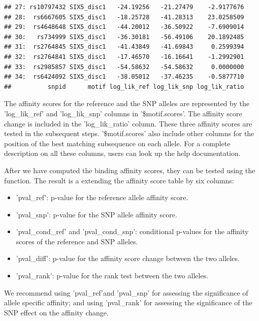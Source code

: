 \documentclass[a4paper,10pt]{article}\usepackage[]{graphicx}\usepackage[]{color}
\makeatletter
\newenvironment{kframe}{%
 \def\at@end@of@kframe{}%
 \ifinner\ifhmode%
  \def\at@end@of@kframe{\end{minipage}}%
  \begin{minipage}{\columnwidth}%
 \fi\fi%
 \def\FrameCommand##1{\hskip\@totalleftmargin \hskip-\fboxsep
 \colorbox{shadecolor}{##1}\hskip-\fboxsep
     \hskip-\linewidth \hskip-\@totalleftmargin \hskip\columnwidth}%
 \MakeFramed {\advance\hsize-\width
   \@totalleftmargin\z@ \linewidth\hsize
   \@setminipage}}%
 {\par\unskip\endMakeFramed%
 \at@end@of@kframe}
\newenvironment{knitrout}{}{} %
\makeatother
\begin{document}
\begin{knitrout}
\begin{kframe}
\begin{verbatim}
## 27: rs10797432 SIX5_disc1   -24.19256   -21.27479    -2.9177676
## 28:  rs6667605 SIX5_disc1   -18.25728   -41.28313    23.0258509
## 29:  rs4648648 SIX5_disc1   -44.20012   -36.50922    -7.6909014
## 30:   rs734999 SIX5_disc1   -36.30181   -56.49106    20.1892485
## 31:  rs2764845 SIX5_disc1   -41.43849   -41.69843     0.2599394
## 32:  rs2764841 SIX5_disc1   -17.46570   -16.16641    -1.2992901
## 33:  rs2985857 SIX5_disc1   -54.58632   -54.58632     0.0000000
## 34:  rs6424092 SIX5_disc1   -38.05012   -37.46235    -0.5877710
##          snpid      motif log_lik_ref log_lik_snp log_lik_ratio
\end{verbatim}
\end{kframe}
\end{knitrout}


The affinity scores for the reference and the SNP alleles are represented by the 'log\_lik\_ref' and 'log\_lik\_snp' columns in '\$motif.scores'. The affinity score change is included in the 'log\_lik\_ratio' column. These three affinity scores are tested in the subsequent steps. '\$motif.scores' also include other columns for the position of the best matching subsequence on each allele. For a complete description on all these columns, users can look up the help documentation.

After we have computed the binding affinity scores, they can be tested using the  function. The result is a  extending the affinity score table by six columns: 

\begin{itemize}
  \item 'pval\_ref': p-value for the reference allele affinity score.
  \item 'pval\_snp': p-value for the SNP allele affinity score.
  \item 'pval\_cond\_ref' and 'pval\_cond\_snp': conditional p-values
    for the affinity scores of the reference and SNP alleles.
  \item 'pval\_diff': p-value for the affinity score change between the two alleles.
  \item 'pval\_rank': p-value for the rank test between the two alleles.
  \end{itemize}

We recommend using 'pval\_ref'and 'pval\_snp' for assessing the significance of allele specific affinity; and using 'pval\_rank' for assessing the significance of the SNP effect on the affinity change.
\end{document}
